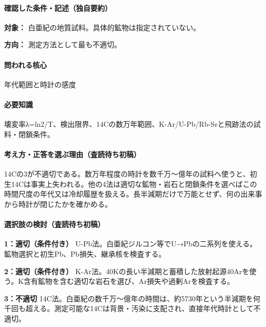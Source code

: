 \paragraph{確認した条件・記述（独自要約）}\mbox{}\par

\noindent\textbf{対象：} 白亜紀の地質試料。具体的鉱物は指定されていない。\par

\noindent\textbf{方向：} 測定方法として最も不適切。\par

\paragraph{問われる核心} 年代範囲と時計の感度

\paragraph{必要知識} 壊変率λ=ln2/T、検出限界、14Cの数万年範囲、K-Ar/U-Pb/Rb-Srと飛跡法の試料・閉鎖条件。

\paragraph{考え方・正答を選ぶ理由（査読待ち初稿）} 14Cの3が不適切である。数万年程度の時計を数千万〜億年の試料へ使うと、初生14Cは事実上失われる。他の4法は適切な鉱物・岩石と閉鎖条件を選べばこの時間尺度の年代又は冷却履歴を扱える。長半減期だけで万能とせず、何の出来事から時計が閉じたかを確かめる。

\paragraph{選択肢の検討（査読待ち初稿）}\mbox{}\par

\noindent\textbf{1：適切（条件付き）} U-Pb法。白亜紀ジルコン等でU→Pbの二系列を使える。鉱物選択と初生Pb、Pb損失、継承核を検査する。\par

\noindent\textbf{2：適切（条件付き）} K-Ar法。40Kの長い半減期と蓄積した放射起源40Arを使う。K含有鉱物を含む適切な岩石を選び、Ar損失や過剰Arを検査する。\par

\noindent\textbf{3：不適切} 14C法。白亜紀の数千万〜億年の時間は、約5730年という半減期を何千回も超える。測定可能な14Cは背景・汚染に支配され、直接年代時計として不適切。\par


